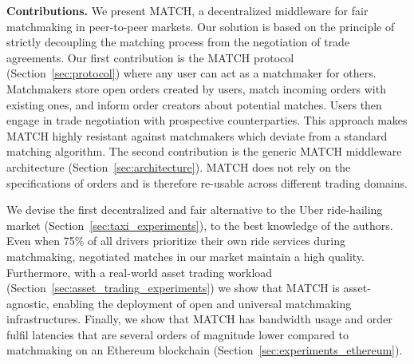 \textbf{Contributions.}
We present MATCH, a decentralized middleware for fair matchmaking in peer-to-peer markets.
Our solution is based on the principle of strictly decoupling the matching process from the negotiation of trade agreements.
Our first contribution is the MATCH protocol (Section~\ref{sec:protocol}) where any user can act as a matchmaker for others.
Matchmakers store open orders created by users, match incoming orders with existing ones, and inform order creators about potential matches.
Users then engage in trade negotiation with prospective counterparties.
This approach makes MATCH highly resistant against matchmakers which deviate from a standard matching algorithm. 
The second contribution is the generic MATCH middleware architecture (Section~\ref{sec:architecture}).
MATCH does not rely on the specifications of orders and is therefore re-usable across different trading domains.

We devise the first decentralized and fair alternative to the Uber ride-hailing market (Section~\ref{sec:taxi_experiments}), to the best knowledge of the authors.
Even when 75\% of all drivers prioritize their own ride services during matchmaking, negotiated matches in our market maintain a high quality.
Furthermore, with a real-world asset trading workload (Section~\ref{sec:asset_trading_experiments}) we show that MATCH is asset-agnostic, enabling the deployment of open and universal matchmaking infrastructures.
Finally, we show that MATCH has bandwidth usage and order fulfil latencies that are several orders of magnitude lower compared to matchmaking on an Ethereum blockchain (Section~\ref{sec:experiments_ethereum}). 

